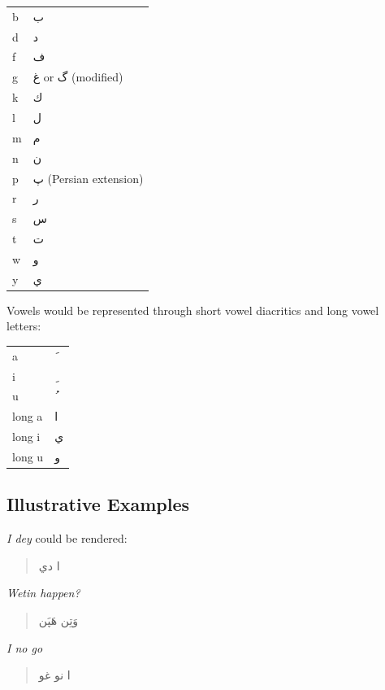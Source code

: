 \documentclass[12pt]{article}
\newcommand{\AR}[1]{\foreignlanguage{arabic}{#1}}
\begin{document}
\begin{center}
\begin{tabular}{ll}
b & \AR{ب} \\
d & \AR{د} \\
f & \AR{ف} \\
g & \AR{غ} or \AR{گ} (modified) \\
k & \AR{ك} \\
l & \AR{ل} \\
m & \AR{م} \\
n & \AR{ن} \\
p & \AR{پ} (Persian extension) \\
r & \AR{ر} \\
s & \AR{س} \\
t & \AR{ت} \\
w & \AR{و} \\
y & \AR{ي} \\
\end{tabular}
\end{center}

Vowels would be represented through short vowel diacritics and long vowel letters:

\begin{center}
\begin{tabular}{ll}
a & \AR{َ} \\
i & \AR{ِ} \\
u & \AR{ُ} \\
long a & \AR{ا} \\
long i & \AR{ي} \\
long u & \AR{و} \\
\end{tabular}
\end{center}

\subsection{Illustrative Examples}

\textit{I dey} could be rendered:

\begin{quote}
\AR{ا دي}
\end{quote}

\textit{Wetin happen?}

\begin{quote}
\AR{وَتِن هَپَن}
\end{quote}

\textit{I no go}

\begin{quote}
\AR{ا نو غو}
\end{quote}
\end{document}
